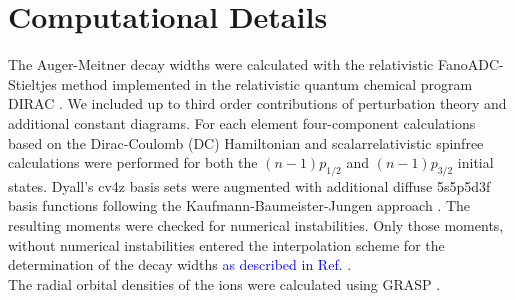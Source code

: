 \section{Computational Details}
\label{section:computational}
The Auger-Meitner
decay widths were calculated with the relativistic FanoADC-Stieltjes
method
implemented in the relativistic quantum chemical program DIRAC \cite{DIRAC17}.
We included up to third order contributions of perturbation theory and additional
constant diagrams.
For each element four-component calculations based on the
Dirac-Coulomb (DC) Hamiltonian
and scalarrelativistic spinfree calculations were
performed for both the $(n-1)p_{1/2}$ and $(n-1)p_{3/2}$ initial states.
Dyall's cv4z basis sets \cite{Dyall4s-7s09} were augmented with additional diffuse
5s5p5d3f
basis functions following the Kaufmann-Baumeister-Jungen approach
\cite{Kaufmann89}.
The resulting moments were checked for numerical instabilities.
Only those moments, without numerical instabilities entered the interpolation
scheme for the determination of the decay widths
\textcolor{blue}
{as described in Ref. \cite{Fasshauer15_1}}.\\
The radial orbital densities of the ions were calculated using GRASP
\cite{Dyall89,Parpia96}.
